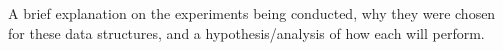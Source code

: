 A brief explanation on the experiments being conducted, why they were chosen for these data structures, and a hypothesis/analysis of how each will perform.